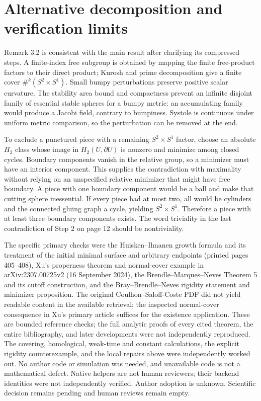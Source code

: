 \documentclass[10pt]{article}
\begin{document}
\section*{Alternative decomposition and verification limits}
Remark 3.2 is consistent with the main result after clarifying its compressed steps. A finite-index free subgroup is obtained by mapping the finite free-product factors to their direct product; Kurosh and prime decomposition give a finite cover \(\#^k(S^2\times S^1)\). Small bumpy perturbations preserve positive scalar curvature. The stability area bound and compactness prevent an infinite disjoint family of essential stable spheres for a bumpy metric: an accumulating family would produce a Jacobi field, contrary to bumpiness. Systole is continuous under uniform metric comparison, so the perturbation can be removed at the end.\par
To exclude a punctured piece with a remaining \(S^2\times S^1\) factor, choose an absolute \(H_2\) class whose image in \(H_2(U,\partial U)\) is nonzero and minimize among closed cycles. Boundary components vanish in the relative group, so a minimizer must have an interior component. This supplies the contradiction with maximality without relying on an unspecified relative minimizer that might have free boundary. A piece with one boundary component would be a ball and make that cutting sphere inessential. If every piece had at most two, all would be cylinders and the connected gluing graph a cycle, yielding \(S^2\times S^1\). Therefore a piece with at least three boundary components exists. The word triviality in the last contradiction of Step 2 on page 12 should be nontriviality.\par
The specific primary checks were the Huisken–Ilmanen growth formula and its treatment of the initial minimal surface and arbitrary endpoints (printed pages 405–408), Xu’s properness theorem and normal-cover example in arXiv:2307.00725v2 (16 September 2024), the Brendle–Marques–Neves Theorem 5 and its cutoff construction, and the Bray–Brendle–Neves rigidity statement and minimizer proposition. The original Coulhon–Saloff-Coste PDF did not yield readable content in the available retrieval; the inspected normal-cover consequence in Xu’s primary article suffices for the existence application. These are bounded reference checks; the full analytic proofs of every cited theorem, the entire bibliography, and later developments were not independently reproduced. The covering, homological, weak-time and constant calculations, the explicit rigidity counterexample, and the local repairs above were independently worked out. No author code or simulation was needed, and unavailable code is not a mathematical defect. Native helpers are not human reviewers; their backend identities were not independently verified. Author adoption is unknown. Scientific decision remains pending and human reviews remain empty.\par
\end{document}
